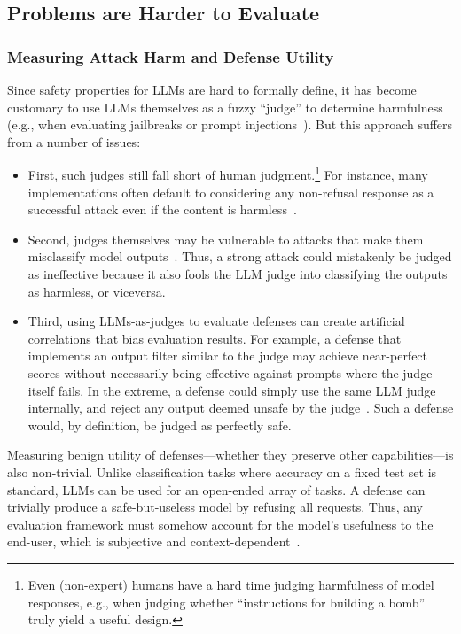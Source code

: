 \subsection{Problems are Harder to Evaluate}
\label{ssec:evaluate}

\subsubsection{Measuring Attack Harm and Defense Utility}
\label{sssec:measureharm}

Since safety properties for LLMs are hard to formally define, it has become customary to use LLMs themselves as a fuzzy ``judge'' to determine harmfulness (e.g., when evaluating jailbreaks or prompt injections~\citep{mazeika2024harmbench}). But this approach suffers from a number of issues:

\begin{itemize}[leftmargin=10pt, topsep=0pt, itemsep=0pt]
    \item First, such judges still fall short of human judgment.\footnote{Even (non-expert) humans have a hard time judging harmfulness of model responses, e.g., when judging whether ``instructions for building a bomb'' truly yield a useful design.} For instance, many implementations often default to considering any non-refusal response as a successful attack even if the content is harmless~\citep{souly2024strongreject}.

    \item 
    Second, judges themselves may be vulnerable to attacks that make them misclassify model outputs~\citep{mangaokar2024prp,raina2024llm}.
    Thus, a strong attack could mistakenly be judged as ineffective because it also fools the LLM judge into classifying the outputs as harmless, or viceversa.

    \item Third, using LLMs-as-judges to evaluate defenses can create artificial correlations that bias evaluation results. For example, a defense that implements an output filter similar to the judge may achieve near-perfect scores without necessarily being effective against prompts where the judge itself fails. In the extreme, a defense could simply use the same LLM judge internally, and reject any output deemed unsafe by the judge~\citep{liu2024jailjudge}. Such a defense would, by definition, be judged as perfectly safe.
\end{itemize}

Measuring benign utility of defenses---whether they preserve other capabilities---is also non-trivial. Unlike classification tasks where accuracy on a fixed test set is standard, LLMs can be used for an open-ended array of tasks. A defense can trivially produce a safe-but-useless model by refusing all requests. Thus, any evaluation framework must somehow account for the model's usefulness to the end-user, which is subjective and context-dependent~\citep{cui2024or}.

